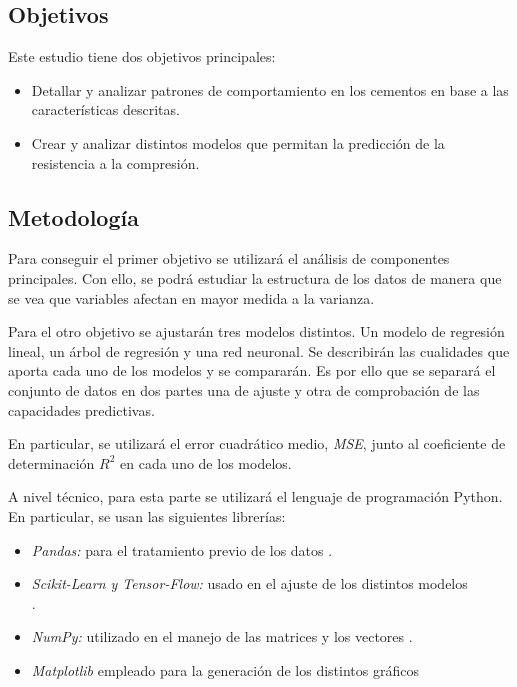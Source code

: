 \subsection*{Objetivos}

\noindent Este estudio tiene dos objetivos principales:
\begin{itemize}
\item Detallar y analizar patrones de comportamiento en los cementos en base a las características descritas. 
\item Crear y analizar distintos modelos que permitan la predicción de la resistencia a la compresión. 
\end{itemize}
\subsection*{Metodología}

\noindent Para conseguir el primer objetivo se utilizará el análisis de componentes principales. Con ello, se podrá estudiar la estructura de los datos de manera que se vea que variables afectan en mayor medida a la varianza. 

\noindent Para el otro objetivo se ajustarán   tres modelos distintos. Un modelo de regresión lineal, un árbol de regresión y una red neuronal. Se describirán las cualidades que aporta cada uno de los modelos y se compararán. Es por ello que se separará el conjunto de datos en dos partes una de ajuste y otra de comprobación de las capacidades predictivas. 

\noindent En particular, se utilizará el error cuadrático medio, \emph{MSE}, junto al coeficiente de determinación $R^2$ en cada uno de los modelos. 

\noindent A nivel técnico, para esta parte se utilizará el lenguaje de programación Python. En particular, se usan las siguientes librerías:
\begin{itemize}
\item \emph{Pandas:} para el tratamiento previo de los datos \cite{Pandas}. 
\item \emph{Scikit-Learn y Tensor-Flow:} usado en el ajuste de los distintos modelos \\ \cite{Scikit-Learn, TensorFlow}. 
\item \emph{NumPy:} utilizado en el manejo de las matrices y los vectores \cite{Numpy}. 
\item \emph{Matplotlib} empleado para la generación de los distintos gráficos \cite{Matplotlib}
\end{itemize}

